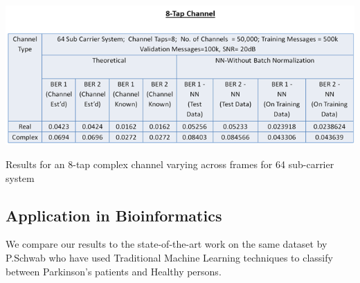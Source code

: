 \begin{table}[htbp]
  \centering
  \includegraphics[width=\textwidth]{./Figures/noma_8tap_res.png}
  \caption{Results for an 8-tap complex channel varying across frames for 64 sub-carrier system}
  \label{tbl:noma_8tap_res}
\end{table}
\subsection{Application in Bioinformatics}
We compare our results to the state-of-the-art work on the same dataset by P.Schwab \cite{schwab2018phonemd} who have used Traditional Machine Learning techniques to classify between Parkinson's patients and Healthy persons.
